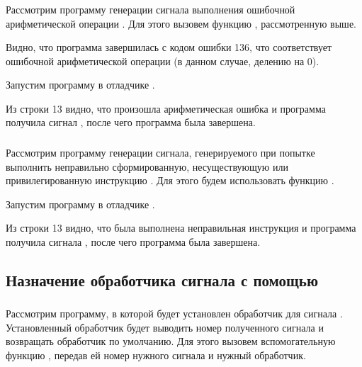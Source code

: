 \subsubsection{}

Рассмотрим программу генерации сигнала выполнения ошибочной арифметической операции . Для этого вызовем функцию , рассмотренную выше.


Видно, что программа завершилась с кодом ошибки 136, что соответствует ошибочной арифметической операции (в данном случае, делению на 0).

Запустим программу  в отладчике .


Из строки 13 видно, что произошла арифметическая ошибка и программа получила сигнал , после чего программа была завершена.

\subsubsection{}

Рассмотрим программу генерации сигнала, генерируемого при попытке выполнить неправильно сформированную, несуществующую или привилегированную инструкцию . Для этого будем использовать функцию .


Запустим программу  в отладчике .


Из строки 13 видно, что была выполнена неправильная инструкция и программа получила сигнала , после чего программа была завершена.

\subsection{Назначение обработчика сигнала с помощью }

\subsubsection{}

Рассмотрим программу, в которой будет установлен обработчик для сигнала . Установленный обработчик будет выводить номер полученного сигнала и возвращать обработчик по умолчанию. Для этого вызовем вспомогательную функцию , передав ей номер нужного сигнала и нужный обработчик.

